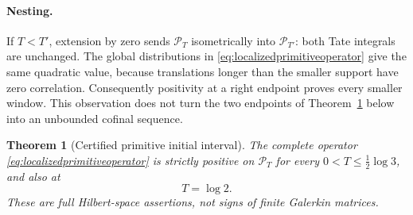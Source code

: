 \documentclass[11pt]{amsart}
\newtheorem{theorem}{Theorem}[section]
\theoremstyle{definition}
\theoremstyle{remark}
\begin{document}
\paragraph{Nesting.}
If \(T<T'\), extension by zero sends \(\mathcal P_T\) isometrically into
\(\mathcal P_{T'}\): both Tate integrals are unchanged.  The global
distributions in \eqref{eq:localizedprimitiveoperator} give the same
quadratic value, because translations longer than the smaller support have
zero correlation.  Consequently positivity at a right endpoint proves every
smaller window.  This observation does not turn the two endpoints of
Theorem~\ref{thm:certifiedendpoints} below into an unbounded cofinal
sequence.

\begin{theorem}[Certified primitive initial interval]\label{thm:certifiedendpoints}
The complete operator \eqref{eq:localizedprimitiveoperator} is strictly
positive on \(\mathcal P_T\) for every \(0<T\le\frac12\log3\), and also at
\[
 T=\log2.
\]
These are full Hilbert-space assertions, not signs of finite Galerkin
matrices.
\end{theorem}
\end{document}

